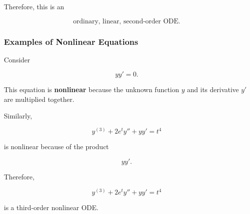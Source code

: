 \documentclass[11pt]{article}
\begin{document}
Therefore, this is an

\[
\boxed{\text{ordinary, linear, second-order ODE}.}
\]

\subsubsection{Examples of Nonlinear Equations}

Consider

\[
yy'=0.
\]

This equation is \textbf{nonlinear} because the unknown function $y$
and its derivative $y'$ are multiplied together.

Similarly,

\[
y^{(3)}
+
2e^t y''
+
yy'
=
t^4
\]

is nonlinear because of the product

\[
yy'.
\]

Therefore,

\[
\boxed{
y^{(3)}+2e^t y''+yy'=t^4
}
\]

is a third-order nonlinear ODE.
\end{document}
